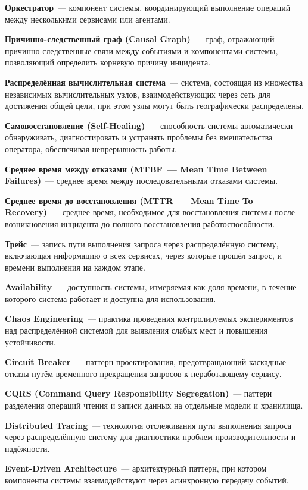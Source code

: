 \begin{sloppypar}
\textbf{Оркестратор}~--- компонент системы, координирующий выполнение операций между несколькими сервисами или агентами.

\textbf{Причинно-следственный граф (Causal Graph)}~--- граф, отражающий причинно-следственные связи между событиями и компонентами системы, позволяющий определить корневую причину инцидента.

\textbf{Распределённая вычислительная система}~--- система, состоящая из множества независимых вычислительных узлов, взаимодействующих через сеть для достижения общей цели, при этом узлы могут быть географически распределены.

\textbf{Самовосстановление (Self-Healing)}~--- способность системы автоматически обнаруживать, диагностировать и устранять проблемы без вмешательства оператора, обеспечивая непрерывность работы.

\textbf{Среднее время между отказами (MTBF~--- Mean Time Between Failures)}~--- среднее время между последовательными отказами системы.

\textbf{Среднее время до восстановления (MTTR~--- Mean Time To Recovery)}~--- среднее время, необходимое для восстановления системы после возникновения инцидента до полного восстановления работоспособности.

\textbf{Трейс}~--- запись пути выполнения запроса через распределённую систему, включающая информацию о всех сервисах, через которые прошёл запрос, и времени выполнения на каждом этапе.

\textbf{Availability}~--- доступность системы, измеряемая как доля времени, в течение которого система работает и доступна для использования.

\textbf{Chaos Engineering}~--- практика проведения контролируемых экспериментов над распределённой системой для выявления слабых мест и повышения устойчивости.

\textbf{Circuit Breaker}~--- паттерн проектирования, предотвращающий каскадные отказы путём временного прекращения запросов к неработающему сервису.

\textbf{CQRS (Command Query Responsibility Segregation)}~--- паттерн разделения операций чтения и записи данных на отдельные модели и хранилища.

\textbf{Distributed Tracing}~--- технология отслеживания пути выполнения запроса через распределённую систему для диагностики проблем производительности и надёжности.

\textbf{Event-Driven Architecture}~--- архитектурный паттерн, при котором компоненты системы взаимодействуют через асинхронную передачу событий.


\end{sloppypar}
